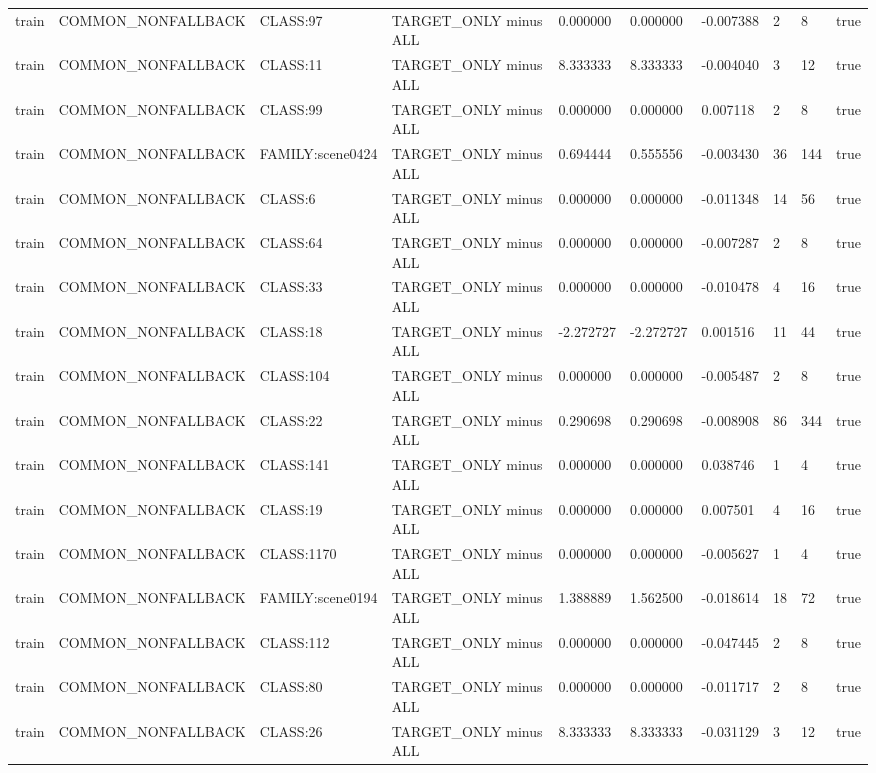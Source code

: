 \begin{tabular}{llllllllll}
train & COMMON\_NONFALLBACK & CLASS:97 & TARGET\_ONLY minus ALL & 0.000000 & 0.000000 & -0.007388 & 2 & 8 & true \\
train & COMMON\_NONFALLBACK & CLASS:11 & TARGET\_ONLY minus ALL & 8.333333 & 8.333333 & -0.004040 & 3 & 12 & true \\
train & COMMON\_NONFALLBACK & CLASS:99 & TARGET\_ONLY minus ALL & 0.000000 & 0.000000 & 0.007118 & 2 & 8 & true \\
train & COMMON\_NONFALLBACK & FAMILY:scene0424 & TARGET\_ONLY minus ALL & 0.694444 & 0.555556 & -0.003430 & 36 & 144 & true \\
train & COMMON\_NONFALLBACK & CLASS:6 & TARGET\_ONLY minus ALL & 0.000000 & 0.000000 & -0.011348 & 14 & 56 & true \\
train & COMMON\_NONFALLBACK & CLASS:64 & TARGET\_ONLY minus ALL & 0.000000 & 0.000000 & -0.007287 & 2 & 8 & true \\
train & COMMON\_NONFALLBACK & CLASS:33 & TARGET\_ONLY minus ALL & 0.000000 & 0.000000 & -0.010478 & 4 & 16 & true \\
train & COMMON\_NONFALLBACK & CLASS:18 & TARGET\_ONLY minus ALL & -2.272727 & -2.272727 & 0.001516 & 11 & 44 & true \\
train & COMMON\_NONFALLBACK & CLASS:104 & TARGET\_ONLY minus ALL & 0.000000 & 0.000000 & -0.005487 & 2 & 8 & true \\
train & COMMON\_NONFALLBACK & CLASS:22 & TARGET\_ONLY minus ALL & 0.290698 & 0.290698 & -0.008908 & 86 & 344 & true \\
train & COMMON\_NONFALLBACK & CLASS:141 & TARGET\_ONLY minus ALL & 0.000000 & 0.000000 & 0.038746 & 1 & 4 & true \\
train & COMMON\_NONFALLBACK & CLASS:19 & TARGET\_ONLY minus ALL & 0.000000 & 0.000000 & 0.007501 & 4 & 16 & true \\
train & COMMON\_NONFALLBACK & CLASS:1170 & TARGET\_ONLY minus ALL & 0.000000 & 0.000000 & -0.005627 & 1 & 4 & true \\
train & COMMON\_NONFALLBACK & FAMILY:scene0194 & TARGET\_ONLY minus ALL & 1.388889 & 1.562500 & -0.018614 & 18 & 72 & true \\
train & COMMON\_NONFALLBACK & CLASS:112 & TARGET\_ONLY minus ALL & 0.000000 & 0.000000 & -0.047445 & 2 & 8 & true \\
train & COMMON\_NONFALLBACK & CLASS:80 & TARGET\_ONLY minus ALL & 0.000000 & 0.000000 & -0.011717 & 2 & 8 & true \\
train & COMMON\_NONFALLBACK & CLASS:26 & TARGET\_ONLY minus ALL & 8.333333 & 8.333333 & -0.031129 & 3 & 12 & true \\

\end{tabular}
